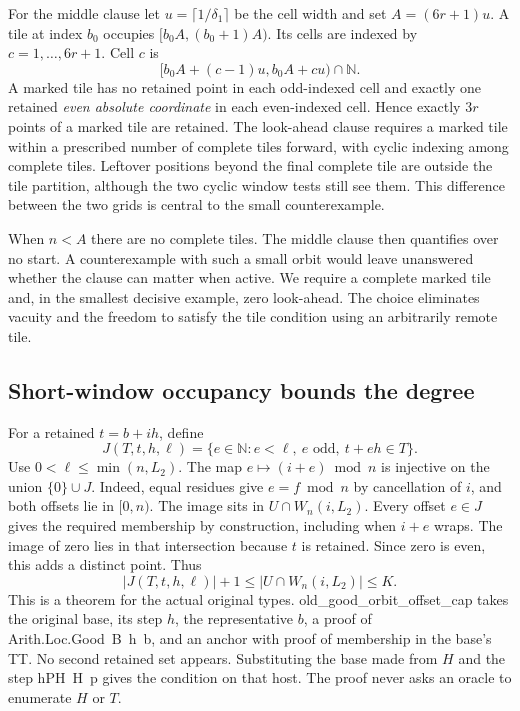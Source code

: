 \documentclass[12pt,letterpaper]{article}
\DeclareRobustCommand{\id}[1]{\mbox{\small\ttfamily #1}}
\begin{document}
For the middle clause let $u=\lceil1/\delta_1\rceil$ be the cell width and set $A=(6r+1)u$. A tile at index $b_0$ occupies $[b_0 A,(b_0+1)A)$. Its cells are indexed by $c=1,\ldots,6r+1$. Cell $c$ is
\[
  [b_0 A+(c-1)u,b_0 A+cu)\cap \mathbb N .
\]
A marked tile has no retained point in each odd-indexed cell and exactly one retained \emph{even absolute coordinate} in each even-indexed cell. Hence exactly $3r$ points of a marked tile are retained. The look-ahead clause requires a marked tile within a prescribed number of complete tiles forward, with cyclic indexing among complete tiles. Leftover positions beyond the final complete tile are outside the tile partition, although the two cyclic window tests still see them. This difference between the two grids is central to the small counterexample.

When $n<A$ there are no complete tiles. The middle clause then quantifies over no start. A counterexample with such a small orbit would leave unanswered whether the clause can matter when active. We require a complete marked tile and, in the smallest decisive example, zero look-ahead. The choice eliminates vacuity and the freedom to satisfy the tile condition using an arbitrarily remote tile.

\subsection{Short-window occupancy bounds the degree}

For a retained $t=b+ih$, define
\[
  J(T,t,h,\ell)=\{e\in\mathbb N:e<\ell,\ e\text{ odd},\ t+eh\in T\}.
\]
Use $0<\ell\le\min(n,L_2)$. The map $e\mapsto(i+e)\bmod n$ is injective on the union $\{0\}\cup J$. Indeed, equal residues give $e=f\bmod n$ by cancellation of $i$, and both offsets lie in $[0,n)$. The image sits in $U\cap W_n(i,L_2)$. Every offset $e\in J$ gives the required membership by construction, including when $i+e$ wraps. The image of zero lies in that intersection because $t$ is retained. Since zero is even, this adds a distinct point. Thus
\begin{equation}
       |J(T,t,h,\ell)|+1\le |U\cap W_n(i,L_2)|\le K .
       \label{eq:oldcap}
\end{equation}
This is a theorem for the actual original types. \id{old\_good\_orbit\_offset\_cap} takes the original base, its step $h$, the representative $b$, a proof of \id{Arith.Loc.Good B h b}, and an anchor with proof of membership in the base's \id{TT}. No second retained set appears. Substituting the base made from $H$ and the step \id{hPH H p} gives the condition on that host. The proof never asks an oracle to enumerate $H$ or $T$.
\end{document}
